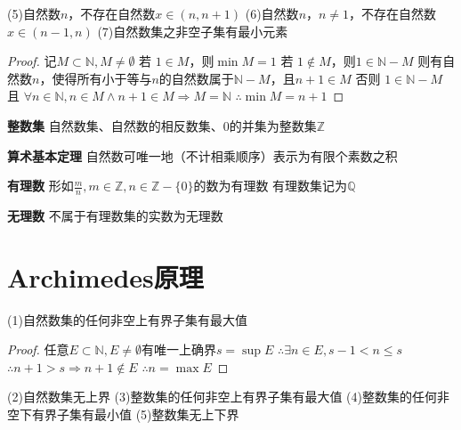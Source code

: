 \documentclass[11pt]{article}
\begin{document}
(5)自然数$n$，不存在自然数$x\in (n,n+1)$ \newline
(6)自然数$n$，$n\not = 1$，不存在自然数$x\in (n-1,n)$ \newline
(7)自然数集之非空子集有最小元素 \newline
\begin{proof}
  记$M\subset\mathbb{N}, M\not = \emptyset$ \newline
  若 $1\in M$，则$\min M=1$ \newline
  若 $1\not\in M$，则$1\in\mathbb{N}-M$ \newline
  则有自然数$n$，使得所有小于等与$n$的自然数属于$\mathbb{N}-M$，且$n+1\in M$ \newline
  否则 $1\in\mathbb{N}-M$ 且 $\forall n\in\mathbb{N}, n\in M\land n+1\in M \Rightarrow M=\mathbb{N}$ \newline
  $\therefore \min M=n+1$
\end{proof}

\textbf{整数集}\newline
自然数集、自然数的相反数集、0的并集为整数集$\mathbb{Z}$ \newline

\textbf{算术基本定理} \newline
自然数可唯一地（不计相乘顺序）表示为有限个素数之积 \newline

\textbf{有理数} \newline
形如$\frac{m}{n}, m\in \mathbb{Z}, n\in \mathbb{Z}-\{0\}$的数为有理数 \newline
有理数集记为$\mathbb{Q}$ \newline

\textbf{无理数} \newline
不属于有理数集的实数为无理数

\section{Archimedes原理}
(1)自然数集的任何非空上有界子集有最大值 \newline
\begin{proof}
  任意$E\subset\mathbb{N}, E\not =\emptyset$有唯一上确界$s=\sup E$ \newline
  $\therefore \exists n\in E, s-1<n\le s$ \newline
  $\therefore n+1>s\Rightarrow n+1\notin E$ \newline
  $\therefore n=\max E$
\end{proof}
(2)自然数集无上界 \newline
(3)整数集的任何非空上有界子集有最大值 \newline
(4)整数集的任何非空下有界子集有最小值 \newline
(5)整数集无上下界 \newline
\end{document}
